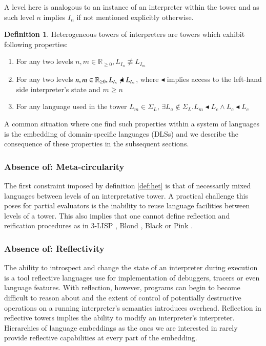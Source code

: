 \documentclass{article}
\theoremstyle{definition}
\newtheorem{definition}{Definition}[section]
\begin{document}
A level here is analogous to an instance of an interpreter within the tower and as such level $n$ implies $I_n$ if not mentioned explicitly otherwise.

\begin{definition}
	Heterogeneous towers of interpreters are towers which exhibit following properties:
	\begin{enumerate}
		\item For any two levels $n, m \in \mathbb R_{\ge 0}, L_{I_n} \not\equiv L_{I_m}$
		\item For any two levels $n, m \in \mathbb R_{\ge 0}, L_{I_n} \not\blacktriangleleft L_{I_m}$, where $\blacktriangleleft$ implies access to the left-hand side interpreter's state and $m \ge n$
		\item For any language used in the tower $L_m \in \Sigma_L$, $\exists L_a \not\in \Sigma_L.L_m \blacktriangleleft L_c \land L_c \blacktriangleleft L_c$
	\end{enumerate}
\end{definition}\label{def:het}
A common situation where one find such properties within a system of languages is the embedding of domain-specific languages (DLSs) and we describe the consequence of these properties in the subsequent sections.

\subsubsection{Absence of: Meta-circularity}
The first constraint imposed by definition \ref{def:het} is that of necessarily mixed languages between levels of an interpretative tower. A practical challenge this poses for partial evaluators is the inability to reuse language facilities between levels of a tower. This also implies that one cannot define reflection and reification procedures as in 3-LISP \cite{smith1984reflection}, Blond \cite{danvy1988intensions}, Black \cite{asai1996duplication} or Pink \cite{amin2017collapsing}.

\subsubsection{Absence of: Reflectivity}
The ability to introspect and change the state of an interpreter during execution is a tool reflective languages use for implementation of debuggers, tracers or even language features. With reflection, however, programs can begin to become difficult to reason about and the extent of control of potentially destructive operations on a running interpreter's semantics introduces overhead. Reflection in reflective towers implies the ability to modify an interpreter's interpreter. Hierarchies of language embeddings as the ones we are interested in rarely provide reflective capabilities at every part of the embedding.
\end{document}
